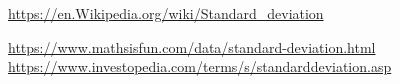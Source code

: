 \documentclass[a0paper,portrait]{baposter}
\begin{document}

\begin{thebibliography}{1}

\url{https://en.Wikipedia.org/wiki/Standard_deviation}

\url{https://www.mathsisfun.com/data/standard-deviation.html}
\url{https://www.investopedia.com/terms/s/standarddeviation.asp}

\end{thebibliography}


 
\end{document}
